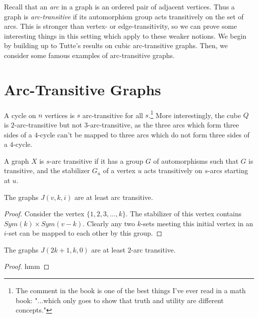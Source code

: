 \renewcommand{\exc}[1]{\subsubsection*{Exercise 4.#1}}


Recall that an \textit{arc} in a graph is an ordered pair of adjacent vertices.  Thus a graph is \textit{arc-transitive} if its automorphism group acts transitively on the set of arcs.  This is stronger than vertex- or edge-transitivity, so we can prove some interesting things in this setting which apply to these weaker notions.  We begin by building up to Tutte's results on cubic arc-transitive graphs.  Then, we consider some famous examples of arc-transitive graphs.

\section*{Arc-Transitive Graphs}

A cycle on $n$ vertices is $s$ arc-transitive for all $s$.\footnote{The comment in the book is one of the best things I've ever read in a math book: "...which only goes to show that truth and utility are different concepts."}  More interestingly, the cube $Q$ is $2$-arc-transitive but not $3$-arc-transitive, as the three arcs which form three sides of a $4$-cycle can't be mapped to three arcs which do not form three sides of a $4$-cycle.

A graph $X$ is $s$-arc transitive if it has a group $G$ of automorphisms such that $G$ is transitive, and the stabilizer $G_u$ of a vertex $u$ acts transitively on $s$-arcs starting at $u$.

\begin{lemma}
	The graphs $J(v,k,i)$ are at least arc transitive.
\end{lemma}
\begin{proof}
	Consider the vertex $\{1,2,3,\dots,k\}$.  The stabilizer of this vertex contains $Sym(k)\times Sym(v-k)$.  Clearly any two $k$-sets meeting this initial vertex in an $i$-set can be mapped to each other by this group.
\end{proof}


\begin{lemma}
	The graphs $J(2k+1,k,0)$ are at least $2$-arc transitive.
\end{lemma}
\begin{proof}
	hmm
\end{proof}

\ifdraft


\fi